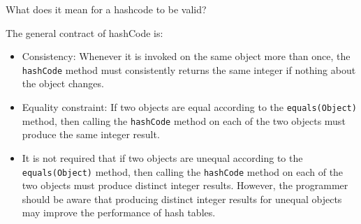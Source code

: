 \begin{blocksection}
\question What does it mean for a hashcode to be valid?
\begin{solution}[0.75in]
The general contract of hashCode is:
\begin{itemize}
\item Consistency: Whenever it is invoked on the same object more than once,
the \lstinline$hashCode$ method must consistently returns the same integer if
nothing about the object changes.
\item Equality constraint: If two objects are equal according to the
\lstinline$equals(Object)$ method, then calling the \lstinline$hashCode$ method
on each of the two objects must produce the same integer result.
\item It is not required that if two objects are unequal according to the
\lstinline$equals(Object)$ method, then calling the \lstinline$hashCode$ method
on each of the two objects must produce distinct integer results. However, the
programmer should be aware that producing distinct integer results for unequal
objects may improve the performance of hash tables.
\end{itemize}
\end{solution}
\end{blocksection}

